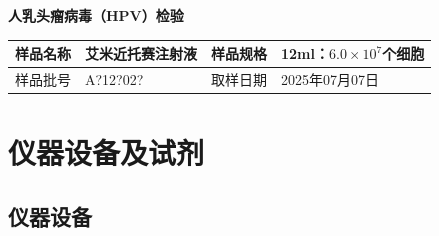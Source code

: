 \documentclass[UTF8,10pt,a4paper,fontset=fandol]{ctexart}
\newcommand{\fieldvalue}[1]{#1}
\newcommand{\handwritten}[1]{#1}
\begin{document}
\begin{center}
\textbf{人乳头瘤病毒（HPV）检验}
\end{center}

\begin{tabular}{|p{2.3cm}|p{5.0cm}|p{2.1cm}|p{4.0cm}|}
\hline
样品名称 &
\fieldvalue{艾米近托赛注射液} &
样品规格 &
\fieldvalue{12ml：$6.0\times 10^{7}$个细胞}
\\
\hline
样品批号 &
\fieldvalue{\handwritten{A?12?02?}} &
取样日期 &
\fieldvalue{\handwritten{2025年07月07日}}
\\
\hline
\end{tabular}

\section{仪器设备及试剂}

\subsection{仪器设备}
\end{document}

